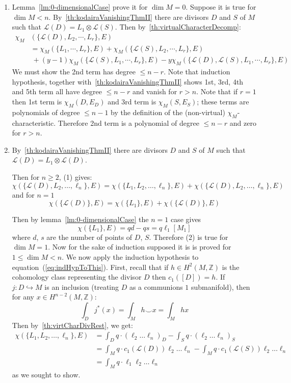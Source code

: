 \documentclass{book}
\newcommand{\Z}{{\mathbb{Z}}}
\newcommand{\CL}{{\mathcal{L}}}
\begin{document}
\begin{Proof}
\begin{enumerate}
  \item Lemma~\cref{lm:0-dimensionalCase} prove it for $\dim M=0$. Suppose it is true for $\dim M<n$.
    By~\cref{th:kodairaVanishingThmII} there are divisors $D$ and $S$ of $M$ such that
    $\CL(D)=L_1\otimes\CL(S)$. Then by~\cref{th:virtualCharacterDecomp}:
    \begin{align*}
      \chi_M&(\{ \CL(D),L_2,\cdots,L_r \},E)\\
    &= \chi_M(\{ L_1,\cdots,L_r \},E) + \chi_M(\{ \CL(S),L_2,\cdots,L_r \},E) \\
                          &\ + (y-1)\chi_M(\{\CL(S),L_1,\cdots,L_r\},E)
                          - y\chi_M(\{\CL(D),\CL(S),L_1,\cdots,L_r\},E)
  \end{align*}
We must show the 2nd term has degree $\leq n-r$. Note that
induction hypothesis, together with~\cref{th:kodairaVanishingThmII} shows 1st, 3rd, 4th and 5th term all have
degree $\leq n-r$ and vanish for $r>n$. Note that if $r=1$ then 1st term is $\chi_M(D,E_D)$ and 3rd term is
$\chi_M(S,E_S)$; these terms are polynomials of degree $\leq n-1$ by the definition of the (non-virtual)
$\chi_M$-characteristic. Therefore 2nd term is a polynomial of degree $\leq n-r$ and zero for $r>n$.
\item By~\cref{th:kodairaVanishingThmII} there are  divisors $D$ and $S$ of $M$
  such that $\CL(D)=L_1\otimes\CL(D)$.

Then for $n\ge 2$, (1) gives:
\[
    \chi(\{ \CL(D),L_2,\ldots,\ell_n \},E) = \chi(\{ L_1,L_2,\ldots,\ell_n \},E) + \chi(\{
    \CL(D),L_2,\ldots,\ell_n \},E)
\]
and for $n=1$
\begin{equation}\label{eq:indHypToThis}
    \chi(\{ \CL(D) \},E) = \chi(\{ L_1 \},E) + \chi(\{ \CL(D) \},E)
\end{equation}

Then by lemma~\cref{lm:0-dimensionalCase} the $n=1$ case gives
\[
    \chi(\{ L_1 \},E) = qd - qs = q\ell_1[M_1]
\]
where $d$, $s$ are the number of points of $D$, $S$. Therefore (2) is true for $\dim M=1$. Now for the sake of
induction supposed it is is proved for $1\leq\dim M<n$. We now apply the induction hypothesis to
equation~(\ref{eq:indHypToThis}). First, recall that if $h \in H^2(M, \Z)$ is the cohomology class
representing the divisor $D$ then $c_1([D]) = h$. If $j: D \hookrightarrow M$ is an inclusion (treating $D$ as
a communions $1$ submanifold), then for any $x \in H^{n-2}(M, \Z)$:
\[
  \int_D j^*(x) = \int_M h\smile x = \int_M hx
\]
Then by~\cref{th:virtCharDivRest}, we get:
\begin{align*}
    \chi(\{ L_1,L_2,\ldots,\ell_n \},E) &= \int_D q\cdot(\ell_2\ldots \ell_n)_D - \int_S q\cdot(\ell_2\ldots \ell_n)_S \\
    &= \int_M q\cdot c_1(\CL(D))\ell_2\ldots \ell_n - \int_Mq\cdot c_1(\CL(S))\ell_2\ldots \ell_n \\
    &= \int_M q\cdot \ell_1\ell_2\ldots \ell_n
\end{align*}
as we sought to show.
\end{enumerate}
\end{Proof}
\end{document}
